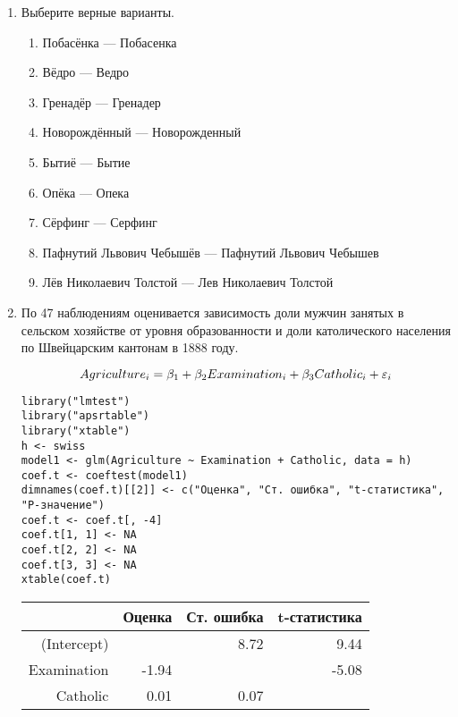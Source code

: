 \documentclass[12pt, a4paper]{article}
\theoremstyle{definition}
\begin{document}
\begin{enumerate}
\item Выберите верные варианты.

\begin{enumerate}
\item Побасёнка — Побасенка
\item Вёдро — Ведро
\item Гренадёр — Гренадер
\item Новорождённый — Новорожденный
\item Бытиё — Бытие
\item Опёка — Опека
\item Сёрфинг — Серфинг
\item Пафнутий Львович Чебышёв — Пафнутий Львович Чебышев
\item Лёв Николаевич Толстой — Лев Николаевич Толстой
\end{enumerate}


\item По 47 наблюдениям оценивается зависимость доли мужчин занятых в сельском хозяйстве от уровня образованности и доли католического населения по Швейцарским кантонам в 1888 году.

\[Agriculture_i=\beta_1+\beta_2 Examination_i+\beta_3 Catholic_i+\varepsilon_i\]

\begin{verbatim}
library("lmtest")
library("apsrtable")
library("xtable")
h <- swiss
model1 <- glm(Agriculture ~ Examination + Catholic, data = h)
coef.t <- coeftest(model1)
dimnames(coef.t)[[2]] <- c("Оценка", "Ст. ошибка", "t-статистика", "P-значение")
coef.t <- coef.t[, -4]
coef.t[1, 1] <- NA
coef.t[2, 2] <- NA
coef.t[3, 3] <- NA
xtable(coef.t)
\end{verbatim}

\begin{table}[ht]
\centering
\begin{tabular}{rrrr}
  \hline
 & Оценка & Ст. ошибка & t-статистика \\
  \hline
(Intercept) &  & 8.72 & 9.44 \\
  Examination & -1.94 &  & -5.08 \\
  Catholic & 0.01 & 0.07 &  \\
   \hline
\end{tabular}
\end{table}





\end{enumerate}
\end{document}
